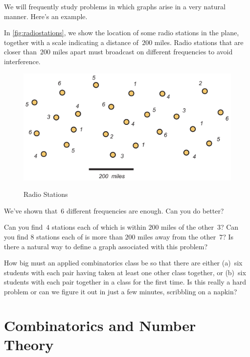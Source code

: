 We will frequently study problems in which graphs
arise in a very natural manner.  Here's an example.

\begin{example}\label{ex:radiostations}
In \autoref{fig:radiostations}, we show the location of some radio stations in the
plane, together with a scale indicating a distance of~$200$ miles.
Radio stations that are closer than~$200$ miles apart must broadcast
on different frequencies to avoid interference.  

\begin{figure}
\begin{center}
\includegraphics[scale=.6]{intro-figs/3012-fig4}\\
\end{center}
\caption{Radio Stations}
\label{fig:radiostations}
\end{figure}

We've shown that~$6$ different frequencies are enough.  
Can you do better?

Can you find~$4$ stations each of which is within
$200$ miles of the other~$3$?  Can you find $8$ stations each of is more
than $200$ miles away from the other~$7$?   Is there a natural
way to define a graph associated with this problem?
\end{example}

\begin{example}
How big must an applied combinatorics class be so that there are
either (a)~six students with each pair having taken at least one
other class together, or (b)~six students with each pair together
in a class for the first time.  Is this really a hard problem or
can we figure it out in just a few minutes, scribbling on a napkin?
\end{example}
 
\section{Combinatorics and Number Theory}\label{s:intro:number}

